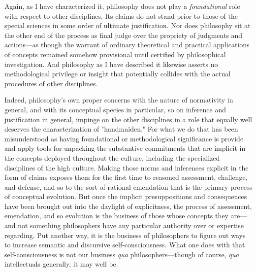 Again, as I have characterized it, philosophy does not play a
\emph{foundational} role with respect to other disciplines. Its claims
do not stand prior to those of the special sciences in some order of
ultimate justification. Nor does philosophy sit at the other end of the
process as final judge over the propriety of judgments and actions---as
though the warrant of ordinary theoretical and practical applications of
concepts remained somehow provisional until certified by philosophical
investigation. And philosophy as I have described it likewise asserts no
methodological privilege or insight that potentially collides with the
actual procedures of other disciplines.

Indeed, philosophy's own proper concerns with the nature of normativity
in general, and with its conceptual species in particular, so on
inference and justification in general, impinge on the other disciplines
in a role that equally well deserves the characterization of
"handmaiden." For what we do that has been misunderstood as having
foundational or methodological significance is provide and apply tools
for unpacking the substantive commitments that are implicit in the
concepts deployed throughout the culture, including the specialized
disciplines of the high culture. Making those norms and inferences
explicit in the form of claims exposes them for the first time to
reasoned assessment, challenge, and defense, and so to the sort of
rational emendation that is the primary process of conceptual evolution.
But once the implicit presuppositions and consequences have been brought
out into the daylight of explicitness, the process of assessment,
emendation, and so evolution is the business of those whose concepts
they are---and not something philosophers have any particular authority
over or expertise regarding. Put another way, it is the business of
philosophers to figure out ways to increase semantic and discursive
self-consciousness. What one does with that self-consciousness is not
our business \emph{qua} philosophers---though of course, \emph{qua}
intellectuals generally, it may well be.

